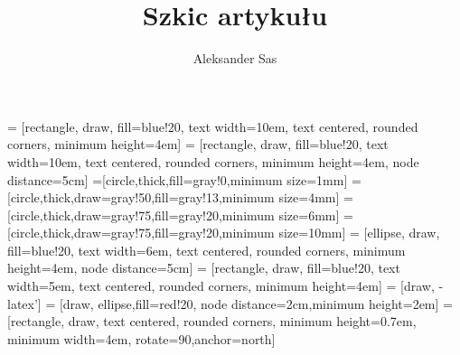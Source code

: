 \documentclass[11pt]{article}
\author{Aleksander Sas}
\title{Szkic artykułu}
\begin{document}
 = [rectangle, draw, fill=blue!20, text width=10em, text centered, rounded corners, minimum height=4em]
 = [rectangle, draw, fill=blue!20, text width=10em, text centered, rounded corners, minimum height=4em, node distance=5cm]
=[circle,thick,fill=gray!0,minimum size=1mm]
=[circle,thick,draw=gray!50,fill=gray!13,minimum size=4mm]
=[circle,thick,draw=gray!75,fill=gray!20,minimum size=6mm]
=[circle,thick,draw=gray!75,fill=gray!20,minimum size=10mm]
 = [ellipse, draw, fill=blue!20, text width=6em, text centered, rounded corners, minimum height=4em, node distance=5cm]
 = [rectangle, draw, fill=blue!20, text width=5em, text centered, rounded corners, minimum height=4em]
 = [draw, -latex']
 = [draw, ellipse,fill=red!20, node distance=2cm,minimum height=2em]
 = [rectangle, draw, text centered, rounded corners, minimum height=0.7em, minimum width=4em, rotate=90,anchor=north]
\maketitle
\tableofcontents
\end{document}
